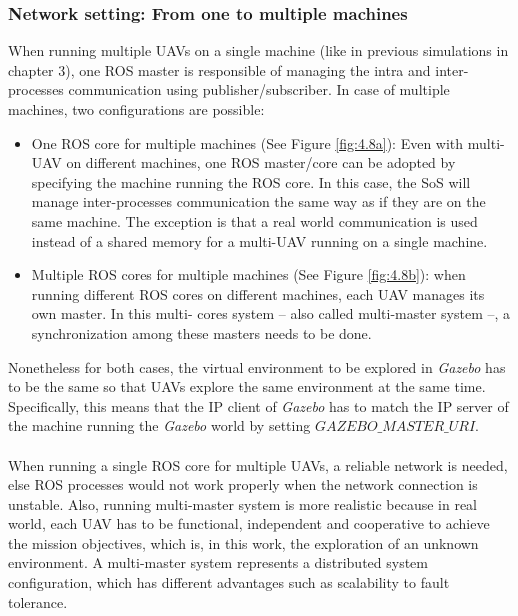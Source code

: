 \documentclass[11pt,openany]{book}
\begin{document}
\begin{algorimth}[H]
\subsubsection{Network setting: From one to multiple machines}
When running multiple UAVs on a single machine (like in previous simulations in chapter 3), one ROS master is responsible of managing the intra and inter-processes communication using publisher/subscriber. In case of multiple machines, two conﬁgurations are possible:
\begin{itemize}
    \item One ROS core for multiple machines (See Figure \ref{fig:4.8a}): Even with multi-UAV on diﬀerent machines, one ROS master/core can be adopted by specifying the machine running the ROS core. In this case, the SoS will manage inter-processes communication the same way as if they are on the same machine. The exception is that a real world communication is used instead of a shared memory for a multi-UAV running on a single machine.
    \item Multiple ROS cores for multiple machines (See Figure \ref{fig:4.8b}): when running diﬀerent ROS cores on diﬀerent machines, each UAV manages its own master. In this multi- cores system – also called multi-master system –, a synchronization among these masters needs to be done.
\end{itemize}
Nonetheless for both cases, the virtual environment to be explored in \textit{Gazebo} has to be the same so that UAVs explore the same environment at the same time. Speciﬁcally, this means that the IP client of \textit{Gazebo} has to match the IP server of the machine running the \textit{Gazebo} world by setting $\textit{GAZEBO\_MASTER\_URI}$.\\\\
When running a single ROS core for multiple UAVs, a reliable network is needed, else ROS processes would not work properly when the network connection is unstable. Also, running multi-master system is more realistic because in real world, each UAV has to be functional, independent and cooperative to achieve the mission objectives, which is, in this work, the exploration of an unknown environment. A multi-master system represents a distributed system conﬁguration, which has diﬀerent advantages such as scalability to fault tolerance.
\begin{figure}[H]
    \centering
    \begin{subfigure}[H]{0.4\linewidth}

\end{subfigure}
\end{figure}
\end{algorimth}
\end{document}
